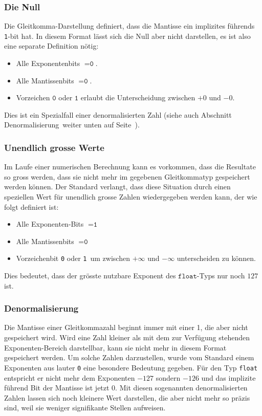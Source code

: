 \subsubsection{Die Null}
Die Gleitkomma-Darstellung definiert, dass die Mantisse ein implizites
führends \texttt{1}-bit hat. 
%
%
%
In diesem Format lässt sich die Null aber nicht darstellen, es ist
also eine separate Definition nötig:
\begin{itemize}
\item Alle Exponentenbits $=\texttt{0}$.
\item Alle Mantissenbits $=\texttt{0}$.
\item Vorzeichen $\texttt{0}$ oder $\texttt{1}$ erlaubt die Unterscheidung
zwischen $+0$ und $-0$.
\end{itemize}
Dies ist ein Spezialfall einer denormalisierten Zahl (siehe auch
Abschnitt Denormalisierung weiter unten auf
Seite~\pageref{buch:zahlensysteme:denormalisierung}).
%
%

\subsubsection{Unendlich grosse Werte}
%
Im Laufe einer numerischen Berechnung kann es vorkommen, dass die Resultate
so gross werden, dass sie nicht mehr im gegebenen Gleitkommatyp gespeichert
werden können.
Der Standard verlangt, dass diese Situation durch einen speziellen Wert
für unendlich grosse Zahlen wiedergegeben werden kann, der wie
folgt definiert ist:
\begin{itemize}
\item Alle Exponenten-Bits $= \texttt{1}$
\item Alle Mantissenbits $=\texttt{0}$
\item Vorzeichenbit \texttt{0} oder \texttt{1} um zwischen
$+\infty$ und $-\infty$ unterscheiden zu können.
\end{itemize}
Dies bedeutet, dass der grösste nutzbare Exponent des $\texttt{float}$-Typs
nur noch $127$ ist.

\subsubsection{Denormalisierung
\label{buch:zahlensysteme:denormalisierung}}
%
%
Die Mantisse einer Gleitkommazahl beginnt immer mit einer 1, die aber
nicht gespeichert wird.
Wird eine Zahl kleiner als mit dem zur Verfügung stehenden Exponenten-Bereich
darstellbar, kann sie nicht mehr in diesem Format gespeichert werden.
Um solche Zahlen darzustellen, wurde vom Standard einem Exponenten aus
lauter \texttt{0} eine besondere Bedeutung gegeben.
Für den Typ \texttt{float} entspricht er nicht mehr dem Exponenten $-127$
sondern $-126$ und das implizite führend Bit der Mantisse ist jetzt 0.
Mit diesen sogenannten denormalisierten Zahlen lassen sich noch kleinere
Wert darstellen, die aber nicht mehr so präzis sind, weil sie weniger
signifikante Stellen aufweisen.

